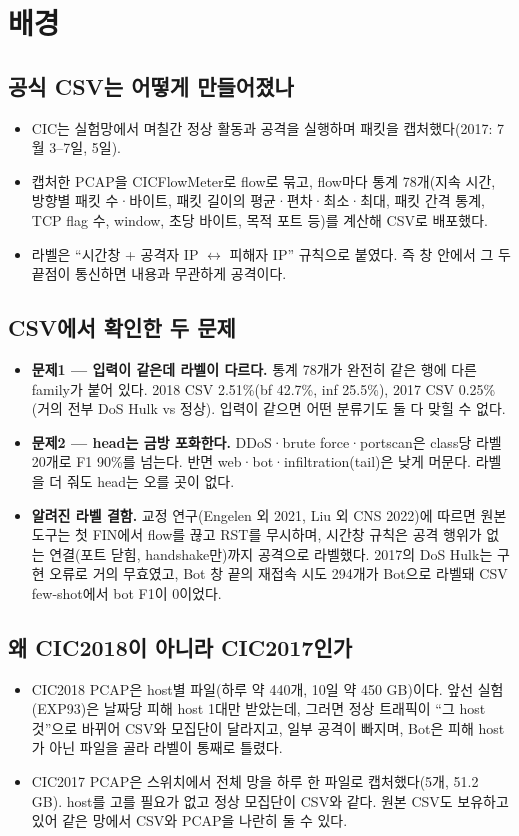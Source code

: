 \section{배경}
\subsection{공식 CSV는 어떻게 만들어졌나}
\begin{itemize}
\item CIC는 실험망에서 며칠간 정상 활동과 공격을 실행하며 패킷을 캡처했다(2017: 7월 3--7일, 5일).
\item 캡처한 PCAP을 CICFlowMeter로 flow로 묶고, flow마다 통계 78개(지속 시간, 방향별 패킷 수·바이트, 패킷 길이의 평균·편차·최소·최대, 패킷 간격 통계, TCP flag 수, window, 초당 바이트, 목적 포트 등)를 계산해 CSV로 배포했다.
\item 라벨은 ``시간창 + 공격자 IP $\leftrightarrow$ 피해자 IP'' 규칙으로 붙였다. 즉 창 안에서 그 두 끝점이 통신하면 내용과 무관하게 공격이다.
\end{itemize}

\subsection{CSV에서 확인한 두 문제}
\begin{itemize}
\item \textbf{문제1 --- 입력이 같은데 라벨이 다르다.} 통계 78개가 완전히 같은 행에 다른 family가 붙어 있다. 2018 CSV 2.51\%(bf 42.7\%, inf 25.5\%), 2017 CSV 0.25\%(거의 전부 DoS Hulk vs 정상). 입력이 같으면 어떤 분류기도 둘 다 맞힐 수 없다.
\item \textbf{문제2 --- head는 금방 포화한다.} DDoS·brute force·portscan은 class당 라벨 20개로 F1 90\%를 넘는다. 반면 web·bot·infiltration(tail)은 낮게 머문다. 라벨을 더 줘도 head는 오를 곳이 없다.
\item \textbf{알려진 라벨 결함.} 교정 연구(Engelen 외 2021, Liu 외 CNS 2022)에 따르면 원본 도구는 첫 FIN에서 flow를 끊고 RST를 무시하며, 시간창 규칙은 공격 행위가 없는 연결(포트 닫힘, handshake만)까지 공격으로 라벨했다. 2017의 DoS Hulk는 구현 오류로 거의 무효였고, Bot 창 끝의 재접속 시도 294개가 Bot으로 라벨돼 CSV few-shot에서 bot F1이 0이었다.
\end{itemize}

\subsection{왜 CIC2018이 아니라 CIC2017인가}
\begin{itemize}
\item CIC2018 PCAP은 host별 파일(하루 약 440개, 10일 약 450 GB)이다. 앞선 실험(EXP93)은 날짜당 피해 host 1대만 받았는데, 그러면 정상 트래픽이 ``그 host 것''으로 바뀌어 CSV와 모집단이 달라지고, 일부 공격이 빠지며, Bot은 피해 host가 아닌 파일을 골라 라벨이 통째로 틀렸다.
\item CIC2017 PCAP은 스위치에서 전체 망을 하루 한 파일로 캡처했다(5개, 51.2 GB). host를 고를 필요가 없고 정상 모집단이 CSV와 같다. 원본 CSV도 보유하고 있어 같은 망에서 CSV와 PCAP을 나란히 둘 수 있다.
\end{itemize}

